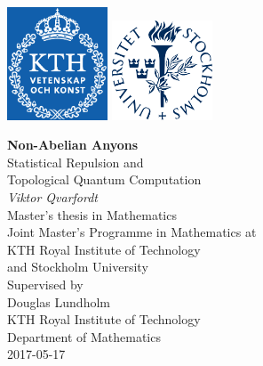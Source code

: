 


\usepackage[pass]{geometry}




\begin{titlepage}
  \noindent\includegraphics[width=3cm]{img/kth}
  \hfill
  \includegraphics[width=3cm]{img/su.eps} \\
  \centering
  \par
  \vspace{3cm}
  {\Huge\textbf{Non-Abelian Anyons}}\\[1em]
  {\huge Statistical Repulsion and\\[0.3em]Topological Quantum Computation} \\
  \vspace{1.75cm}
  \large
  {\large\textit{Viktor Qvarfordt}} \\
  \vspace{1.75cm}
  Master's thesis in Mathematics \\
  \vspace{0.75cm}
  Joint Master's Programme in Mathematics at \\
  KTH Royal Institute of Technology \\
  and Stockholm University \\
  \vspace{1.75cm}
  Supervised by \\[0.5em]
  Douglas Lundholm \\[0.5em]
  KTH Royal Institute of Technology \\
  Department of Mathematics \\
  \vspace{1.75cm}
  2017-05-17
\end{titlepage}
\restoregeometry



\tableofcontents
\newpage










\appendix


\backmatter



